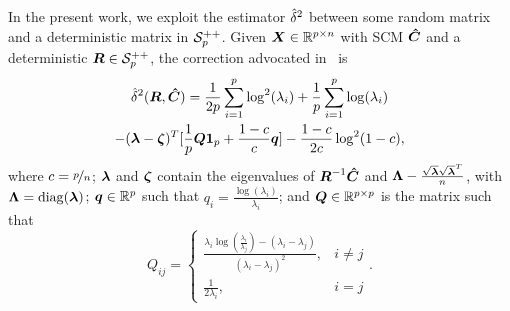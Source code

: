 \documentclass{article}
\theoremstyle{plain}
\theoremstyle{definition}
\theoremstyle{remark}
\begin{document}
%
In the present work, we exploit the estimator $\hat{\delta}^2$ between some random matrix and a deterministic matrix in $\mathcal{S}^{++}_{p}$.
Given $\boldsymbol{X}\in\mathbb{R}^{p\times n}$ with SCM $\boldsymbol{\hat{C}}$ and a deterministic $\boldsymbol{R}\in\mathcal{S}^{++}_{p}$, the correction advocated in~\cite{couillet2019random} is
\begin{multline}
    \hat{\delta}^2(\boldsymbol{R},\boldsymbol{\hat{C}}) = \frac1{2p}\sum_{i=1}^{p} \log^2(\lambda_i)
    + \frac1{p}\sum_{i=1}^{p} \log(\lambda_i)
    \\
    - (\boldsymbol{\lambda}-\boldsymbol{\zeta})^T[ \frac1{p}\boldsymbol{Q}\boldsymbol{1}_{p} +\frac{1-c}{c}\boldsymbol{q} ]
    - \frac{1-c}{2c}\log^2(1-c),
\label{eq:RMT_Fisher_SCM_deterministic}
\end{multline}
where $c=\nicefrac{p}{n}$;
$\boldsymbol{\lambda}$ and $\boldsymbol{\zeta}$ contain the eigenvalues of $\boldsymbol{R}^{-1}\boldsymbol{\hat{C}}$ and $\boldsymbol{\Lambda}-\frac{\sqrt{\boldsymbol{\lambda}}\sqrt{\boldsymbol{\lambda}}^T}{n}$, with $\boldsymbol{\Lambda}=\operatorname{diag}(\boldsymbol{\lambda})$;
$\boldsymbol{q}\in\mathbb{R}^{p}$ such that $q_i=\frac{\log(\lambda_i)}{\lambda_i}$;
and $\boldsymbol{Q}\in\mathbb{R}^{p\times p}$ is the matrix such that
\begin{equation*}
    Q_{ij} = \left\{ 
    \begin{matrix}
        \frac{\lambda_i\log\left(\frac{\lambda_i}{\lambda_j}\right) - (\lambda_i-\lambda_j)}{(\lambda_i-\lambda_j)^2}, & i\neq j
        \\
        \frac1{2\lambda_i}, & i=j
    \end{matrix}
    \right. .
\end{equation*}
\end{document}

